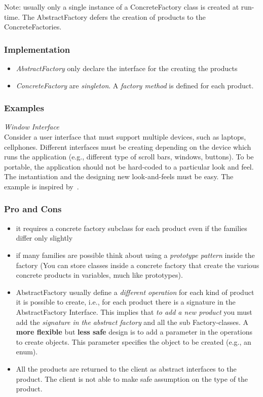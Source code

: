 \documentclass{article}
\begin{document}
Note: usually only a single instance of a ConcreteFactory class is created at run-time. The AbstractFactory defers the creation of products to the ConcreteFactories.

\subsubsection{Implementation}
\begin{itemize}
\item \emph{AbstractFactory} only declare the interface for the creating the products
\item \emph{ConcreteFactory} are \emph{singleton}. A \emph{factory method} is defined for each product. 
\end{itemize}


\subsubsection{Examples}
\emph{Window Interface}\\
Consider a user interface that must support multiple devices, such as laptops, cellphones. Different interfaces must be creating depending on the device which runs the application (e.g., different type of scroll bars, windows, buttons). To be portable, the application should not be hard-coded to a particular look and feel. The instantiation and the designing new look-and-feels must be easy. The example is inspired by~\cite{gamma1994design}.



\subsubsection{Pro and Cons}
\begin{itemize}
\item it requires a concrete factory subclass for each product even if the families differ only slightly
\item if many families are possible think about using a \emph{prototype pattern} inside the factory (You can store classes inside a concrete factory that create the various concrete products in variables, much like prototypes).
\item AbstractFactory usually define a \emph{different operation} for each kind of product it is possible to create, i.e., for each product there is a signature in the AbstractFactory Interface. This implies that \emph{to add a new product} you must add the \emph{signature in the abstract factory} and all the sub Factory-classes. A \textbf{more flexible} but \textbf{less safe} design is to add a parameter in the operations to create objects. This parameter specifies the object to be created (e.g., an enum).
\item All the products are returned to the client as abstract interfaces to the product. The client is not able to make safe assumption on the type of the product.
\end{itemize}
\end{document}
